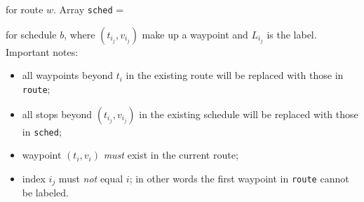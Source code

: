 \documentclass{article}
\theoremstyle{definition}
\begin{document}
\noindent for route $w$. Array {\tt{}sched} =

\noindent
{}

\noindent for schedule $b$, where $(t_{i_j},v_{i_j})$ make up a waypoint and
$L_{i_j}$ is the label. Important notes:
\begin{itemize}
\item all waypoints beyond $t_i$ in the existing route will be replaced with
those in {\tt{}route};
\item all stops beyond $(t_{i_j},v_{i_j})$ in the existing schedule will be
replaced with those in {\tt{}sched};
\item waypoint $(t_i,v_i)$ \emph{must} exist in the current route;
\item index $i_j$ must \emph{not} equal $i$; in other words the first waypoint
in {\tt{}route} cannot be labeled.
\end{itemize}
\end{document}
